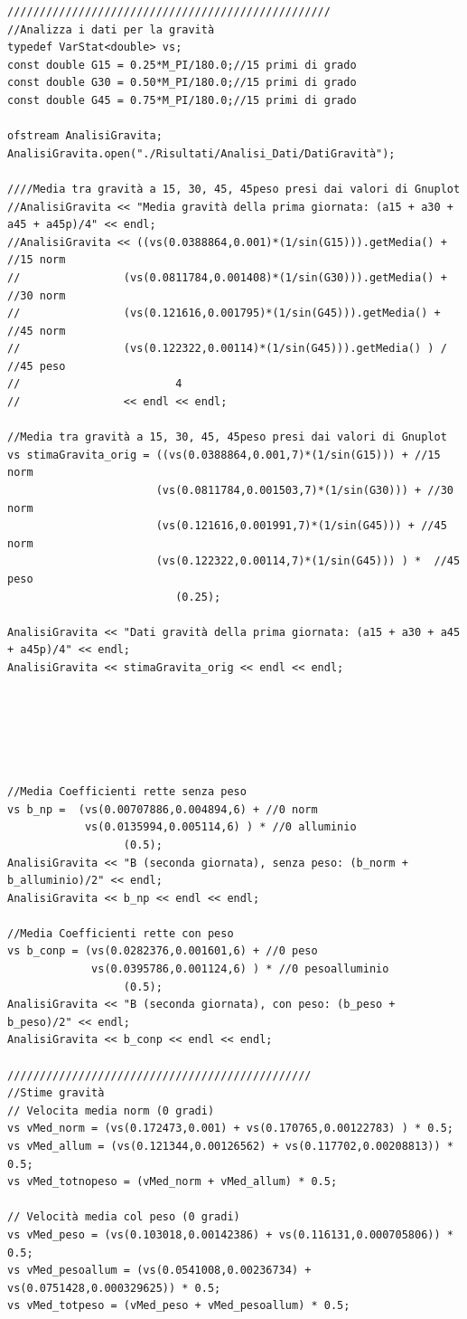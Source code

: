 \documentclass[12pt]{article} %
\begin{document}
\begin{verbatim}
//////////////////////////////////////////////////
//Analizza i dati per la gravità
typedef VarStat<double> vs;
const double G15 = 0.25*M_PI/180.0;//15 primi di grado
const double G30 = 0.50*M_PI/180.0;//15 primi di grado
const double G45 = 0.75*M_PI/180.0;//15 primi di grado

ofstream AnalisiGravita;
AnalisiGravita.open("./Risultati/Analisi_Dati/DatiGravità");

////Media tra gravità a 15, 30, 45, 45peso presi dai valori di Gnuplot
//AnalisiGravita << "Media gravità della prima giornata: (a15 + a30 + a45 + a45p)/4" << endl;
//AnalisiGravita << ((vs(0.0388864,0.001)*(1/sin(G15))).getMedia() + //15 norm
//				  (vs(0.0811784,0.001408)*(1/sin(G30))).getMedia() + //30 norm
//				  (vs(0.121616,0.001795)*(1/sin(G45))).getMedia() + //45 norm
//				  (vs(0.122322,0.00114)*(1/sin(G45))).getMedia() ) / //45 peso
//						  4
//				  << endl << endl;

//Media tra gravità a 15, 30, 45, 45peso presi dai valori di Gnuplot
vs stimaGravita_orig = ((vs(0.0388864,0.001,7)*(1/sin(G15))) + //15 norm
				  	   (vs(0.0811784,0.001503,7)*(1/sin(G30))) + //30 norm
				  	   (vs(0.121616,0.001991,7)*(1/sin(G45))) + //45 norm
				  	   (vs(0.122322,0.00114,7)*(1/sin(G45))) ) *  //45 peso
						  (0.25);

AnalisiGravita << "Dati gravità della prima giornata: (a15 + a30 + a45 + a45p)/4" << endl;
AnalisiGravita << stimaGravita_orig << endl << endl;






//Media Coefficienti rette senza peso
vs b_np =  (vs(0.00707886,0.004894,6) + //0 norm
		  	vs(0.0135994,0.005114,6) ) * //0 alluminio
				  (0.5);
AnalisiGravita << "B (seconda giornata), senza peso: (b_norm + b_alluminio)/2" << endl;
AnalisiGravita << b_np << endl << endl;

//Media Coefficienti rette con peso
vs b_conp = (vs(0.0282376,0.001601,6) + //0 peso
		  	 vs(0.0395786,0.001124,6) ) * //0 pesoalluminio
				  (0.5);
AnalisiGravita << "B (seconda giornata), con peso: (b_peso + b_peso)/2" << endl;
AnalisiGravita << b_conp << endl << endl;

///////////////////////////////////////////////
//Stime gravità
// Velocita media norm (0 gradi)
vs vMed_norm = (vs(0.172473,0.001) + vs(0.170765,0.00122783) ) * 0.5;
vs vMed_allum = (vs(0.121344,0.00126562) + vs(0.117702,0.00208813)) * 0.5;
vs vMed_totnopeso = (vMed_norm + vMed_allum) * 0.5;

// Velocità media col peso (0 gradi)
vs vMed_peso = (vs(0.103018,0.00142386) + vs(0.116131,0.000705806)) * 0.5;
vs vMed_pesoallum = (vs(0.0541008,0.00236734) + vs(0.0751428,0.000329625)) * 0.5;
vs vMed_totpeso = (vMed_peso + vMed_pesoallum) * 0.5;


\end{verbatim}
\end{document}

